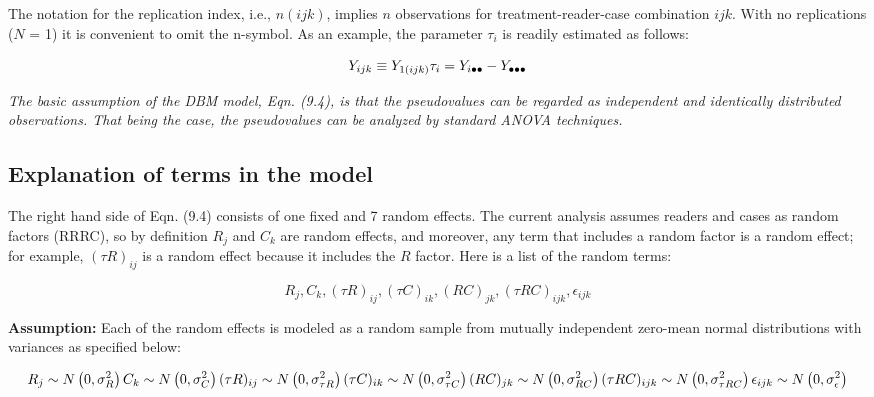 \documentclass[
]{book}
\begin{document}
The notation for the replication index, i.e., \(n(ijk)\), implies \(n\) observations for treatment-reader-case combination \(ijk\). With no replications (\(N\) = 1) it is convenient to omit the n-symbol. As an example, the parameter \(\tau_i\) is readily estimated as follows:

\begin{equation}
Y_{ijk} \equiv Y_{1(ijk)}\\
\tau_i = Y_{i \bullet \bullet} -Y_{\bullet \bullet \bullet} 
\label{eq:estimatingTau}
\end{equation}

\emph{The basic assumption of the DBM model, Eqn. (9.4), is that the pseudovalues can be regarded as independent and identically distributed observations. That being the case, the pseudovalues can be analyzed by standard ANOVA techniques.}

\hypertarget{explanation-of-terms-in-the-model}{%
\subsection{Explanation of terms in the model}\label{explanation-of-terms-in-the-model}}

The right hand side of Eqn. (9.4) consists of one fixed and 7 random effects. The current analysis assumes readers and cases as random factors (RRRC), so by definition \(R_j\) and \(C_k\) are random effects, and moreover, any term that includes a random factor is a random effect; for example, \((\tau R)_{ij}\) is a random effect because it includes the \(R\) factor. Here is a list of the random terms:

\begin{equation}
R_j, C_k, (\tau R)_{ij}, (\tau C)_{ik}, (RC)_{jk},  (\tau RC)_{ijk},  \epsilon_{ijk}
\label{eq:termsInDbmModel}
\end{equation}

\textbf{Assumption:} Each of the random effects is modeled as a random sample from mutually independent zero-mean normal distributions with variances as specified below:

\begin{equation}
R_j  \sim N\left ( 0,\sigma_{R}^{2} \right ) \\
C_k \sim N\left ( 0,\sigma_{C}^{2} \right ) \\
(\tau R)_{ij} \sim N\left ( 0,\sigma_{\tau R}^{2} \right ) \\
(\tau C)_{ik} \sim N\left ( 0,\sigma_{\tau C}^{2} \right ) \\
(RC)_{jk} \sim N\left ( 0,\sigma_{RC}^{2} \right ) \\
(\tau RC)_{ijk} \sim N\left ( 0,\sigma_{\tau RC}^{2} \right ) \\
\epsilon_{ijk} \sim N\left ( 0,\sigma_{\epsilon}^{2} \right )
\label{eq:samplingOfDbmTerms}
\end{equation}
\end{document}
